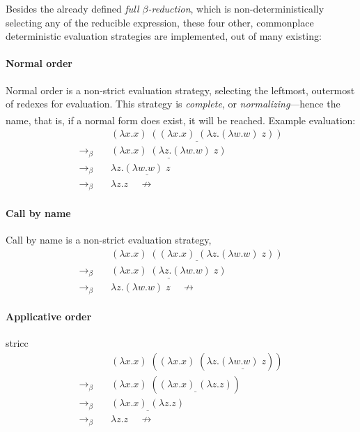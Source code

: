 \documentclass[table, a4paper, 10pt]{article}
\newcommand{\cit}[1]{\textsuperscript{\cite{#1}}}
\begin{document}
Besides the already defined \textit{full $\beta$-reduction}, which is
non-deterministically selecting any of the reducible expression,
these four other, commonplace deterministic evaluation strategies are implemented, out of many existing:

\paragraph{Normal order} Normal order is a non-strict evaluation strategy,
selecting the leftmost, outermost of redexes for evaluation. This strategy
is \textit{complete}, or \textit{normalizing}---hence the name,
that is, if a normal form does exist, it will be reached.\cit{baren94}
Example evaluation:
\begin{align*}
&\underline{(\lambda x.x)\;((\lambda x.x)\;(\lambda z.(\lambda w.w)\;z))}\\
\to_\beta\quad&\underline{(\lambda x.x)\;(\lambda z.(\lambda w.w)\;z)}\\
\to_\beta\quad&\lambda z.\underline{(\lambda w.w)\;z}\\
\to_\beta\quad&\lambda z.z \;\;\;\;\not\to
\end{align*}

\paragraph{Call by name} Call by name is a non-strict evaluation strategy,
\begin{align*}
&\underline{(\lambda x.x)\;((\lambda x.x)\;(\lambda z.(\lambda w.w)\;z))}\\
\to_\beta\quad&\underline{(\lambda x.x)\;(\lambda z.(\lambda w.w)\;z)}\\
\to_\beta\quad&\lambda z.(\lambda w.w)\;z\;\;\;\;\not\to
\end{align*}

\paragraph{Applicative order} stricc
\begin{align*}
&(\lambda x.x)\;((\lambda x.x)\;(\lambda z.\underline{(\lambda w.w)\;z}))\\
\to_\beta\quad&(\lambda x.x)\;(\underline{(\lambda x.x)\;(\lambda z.z)})\\
\to_\beta\quad&\underline{(\lambda x.x)\;(\lambda z.z)}\\
\to_\beta\quad&\lambda z.z\;\;\;\;\not\to
\end{align*}
\end{document}
